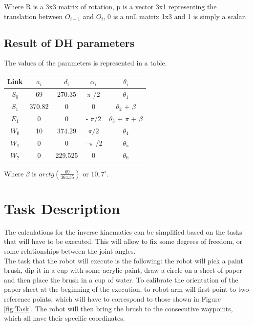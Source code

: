 Where R is a 3x3 matrix of rotation, p is a vector 3x1 representing the translation between $O_{i-1}$ and $O_i$, 0 is a null matrix 1x3 and 1 is simply a scalar.

\subsection{Result of DH parameters}

The values of the parameters is represented in a table.\\

\begin{center}
	\begin{tabular}{c|c c c c }

		Link & $a_i$ & $d_i$ & $\alpha_i$  & $\theta_i$ \\
        \hline
        $S_0$ & 69 & 270.35 & $\pi$ /2 & $\theta_1$ \\
        $S_1$ & 370.82 & 0 & 0 & $\theta_2$ + $\beta$\\
        $E_1$ & 0 & 0 & - $\pi$/2 & $\theta_3$ + $\pi$ + $\beta$\\
        $W_0$ & 10 & 374.29 & $\pi/2$ & $\theta_4$\\
        $W_1$ & 0 & 0 & - $\pi$ /2 & $\theta_5$ \\
        $W_2$ & 0 & 229.525 & 0 & $\theta_6$
	\end{tabular}
\end{center}

Where $\beta$ is $arctg(\frac{69}{364.35})$ or $10,7^\circ$.


\section{Task Description}
The calculations for the inverse kinematics can be simplified based on the tasks that will have to be executed. This will allow to fix some degrees of freedom, or some relationships between the joint angles.\\
\noindent The task that the robot will execute is the following: the robot will pick a paint brush, dip it in a cup with some acrylic paint, draw a circle on a sheet of paper and then place the brush in a cup of water. To calibrate the orientation of the paper sheet at the beginning of the execution, to robot arm will first point to two reference points, which will have to correspond to those shown in Figure \ref{fig:Task}. The robot will then bring the brush to the consecutive waypoints, which all have their specific coordinates.


